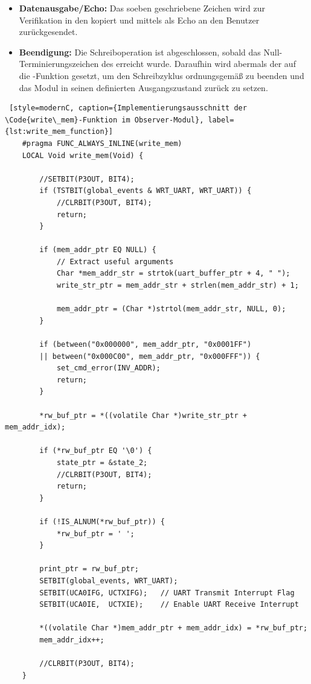 \begin{itemize}
	\item \textbf{Datenausgabe/Echo:} Das soeben geschriebene Zeichen wird zur Verifikation in den  kopiert und mittels  als Echo an den Benutzer zur\"uckgesendet.
	
	\item \textbf{Beendigung:} Die Schreiboperation ist abgeschlossen, sobald das Null-Terminierungszeichen des  erreicht wurde. Daraufhin wird abermals der  auf die -Funktion gesetzt, um den Schreibzyklus ordnungsgem\"a{\ss} zu beenden und das Modul in seinen definierten Ausgangszustand zur\"uck zu setzen.
\end{itemize}


\vspace{0.5cm}
\begin{lstlisting} [style=modernC, caption={Implementierungsausschnitt der \Code{write\_mem}-Funktion im Observer-Modul}, label={lst:write_mem_function}]
	#pragma FUNC_ALWAYS_INLINE(write_mem)
	LOCAL Void write_mem(Void) {
		
		//SETBIT(P3OUT, BIT4);
		if (TSTBIT(global_events & WRT_UART, WRT_UART)) {
			//CLRBIT(P3OUT, BIT4);
			return;
		}
		
		if (mem_addr_ptr EQ NULL) {
			// Extract useful arguments
			Char *mem_addr_str = strtok(uart_buffer_ptr + 4, " ");
			write_str_ptr = mem_addr_str + strlen(mem_addr_str) + 1;
			
			mem_addr_ptr = (Char *)strtol(mem_addr_str, NULL, 0);
		}
		
		if (between("0x000000", mem_addr_ptr, "0x0001FF")
		|| between("0x000C00", mem_addr_ptr, "0x000FFF")) {
			set_cmd_error(INV_ADDR);
			return;
		}
		
		*rw_buf_ptr = *((volatile Char *)write_str_ptr + mem_addr_idx);
		
		if (*rw_buf_ptr EQ '\0') {
			state_ptr = &state_2;
			//CLRBIT(P3OUT, BIT4);
			return;
		}
		
		if (!IS_ALNUM(*rw_buf_ptr)) {
			*rw_buf_ptr = ' ';
		}
		
		print_ptr = rw_buf_ptr;
		SETBIT(global_events, WRT_UART);
		SETBIT(UCA0IFG, UCTXIFG);   // UART Transmit Interrupt Flag
		SETBIT(UCA0IE,  UCTXIE);    // Enable UART Receive Interrupt
		
		*((volatile Char *)mem_addr_ptr + mem_addr_idx) = *rw_buf_ptr;
		mem_addr_idx++;
		
		//CLRBIT(P3OUT, BIT4);
	}
\end{lstlisting}

